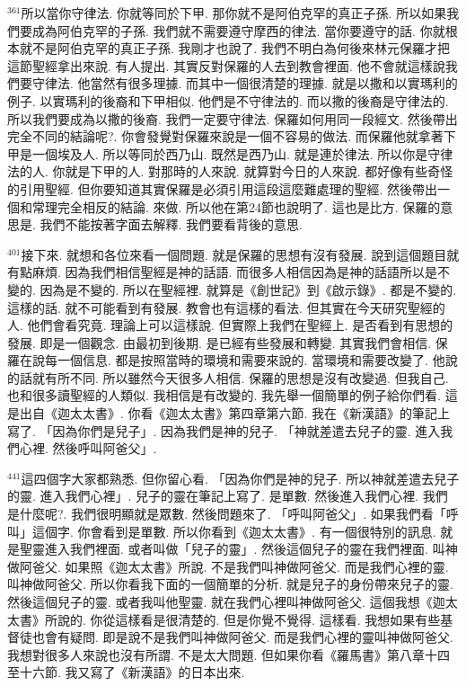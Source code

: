 \documentclass{book}
\begin{document}
$^{361}$所以當你守律法.
你就等同於下甲.
那你就不是阿伯克罕的真正子孫.
所以如果我們要成為阿伯克罕的子孫.
我們就不需要遵守摩西的律法.
當你要遵守的話.
你就根本就不是阿伯克罕的真正子孫.
我剛才也說了.
我們不明白為何後來林元保羅才把這節聖經拿出來說.
有人提出.
其實反對保羅的人去到教會裡面.
他不會就這樣說我們要守律法.
他當然有很多理據.
而其中一個很清楚的理據.
就是以撒和以實瑪利的例子.
以實瑪利的後裔和下甲相似.
他們是不守律法的.
而以撒的後裔是守律法的.
所以我們要成為以撒的後裔.
我們一定要守律法.
保羅如何用同一段經文.
然後帶出完全不同的結論呢?.
你會發覺對保羅來說是一個不容易的做法.
而保羅他就拿著下甲是一個埃及人.
所以等同於西乃山.
既然是西乃山.
就是連於律法.
所以你是守律法的人.
你就是下甲的人.
對那時的人來說.
就算對今日的人來說.
都好像有些奇怪的引用聖經.
但你要知道其實保羅是必須引用這段這麼難處理的聖經.
然後帶出一個和常理完全相反的結論.
來做.
所以他在第24節也說明了.
這也是比方.
保羅的意思是.
我們不能按著字面去解釋.
我們要看背後的意思.

$^{401}$接下來.
就想和各位來看一個問題.
就是保羅的思想有沒有發展.
說到這個題目就有點麻煩.
因為我們相信聖經是神的話語.
而很多人相信因為是神的話語所以是不變的.
因為是不變的.
所以在聖經裡.
就算是《創世記》到《啟示錄》.
都是不變的.
這樣的話.
就不可能看到有發展.
教會也有這樣的看法.
但其實在今天研究聖經的人.
他們會看究竟.
理論上可以這樣說.
但實際上我們在聖經上.
是否看到有思想的發展.
即是一個觀念.
由最初到後期.
是已經有些發展和轉變.
其實我們會相信.
保羅在說每一個信息.
都是按照當時的環境和需要來說的.
當環境和需要改變了.
他說的話就有所不同.
所以雖然今天很多人相信.
保羅的思想是沒有改變過.
但我自己.
也和很多讀聖經的人類似.
我相信是有改變的.
我先舉一個簡單的例子給你們看.
這是出自《迦太太書》.
你看《迦太太書》第四章第六節.
我在《新漢語》的筆記上寫了.
「因為你們是兒子」.
因為我們是神的兒子.
「神就差遣去兒子的靈.
進入我們心裡.
然後呼叫阿爸父」.

$^{441}$這四個字大家都熟悉.
但你留心看.
「因為你們是神的兒子.
所以神就差遣去兒子的靈.
進入我們心裡」.
兒子的靈在筆記上寫了.
是單數.
然後進入我們心裡.
我們是什麼呢?.
我們很明顯就是眾數.
然後問題來了.
「呼叫阿爸父」.
如果我們看「呼叫」這個字.
你會看到是單數.
所以你看到《迦太太書》.
有一個很特別的訊息.
就是聖靈進入我們裡面.
或者叫做「兒子的靈」.
然後這個兒子的靈在我們裡面.
叫神做阿爸父.
如果照《迦太太書》所說.
不是我們叫神做阿爸父.
而是我們心裡的靈.
叫神做阿爸父.
所以你看我下面的一個簡單的分析.
就是兒子的身份帶來兒子的靈.
然後這個兒子的靈.
或者我叫他聖靈.
就在我們心裡叫神做阿爸父.
這個我想《迦太太書》所說的.
你從這樣看是很清楚的.
但是你覺不覺得.
這樣看.
我想如果有些基督徒也會有疑問.
即是說不是我們叫神做阿爸父.
而是我們心裡的靈叫神做阿爸父.
我想對很多人來說也沒有所謂.
不是太大問題.
但如果你看《羅馬書》第八章十四至十六節.
我又寫了《新漢語》的日本出來.
\end{document}
